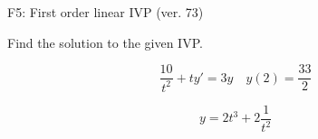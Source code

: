 \begin{exercise}
  \begin{exerciseTitle}F5: First order linear IVP (ver. 73)\end{exerciseTitle}
  \begin{exerciseStatement}
    
Find the solution to the given IVP.

    
\[\frac{10}{t^{2}} +ty'= 3 y \hspace{1em} y( 2 ) = \frac{33}{2}\]

  \end{exerciseStatement}
  \begin{exerciseAnswer}
    
\[y= 2 t^ 3 +2 \frac{1}{t^{2}}\]

  \end{exerciseAnswer}
\end{exercise}